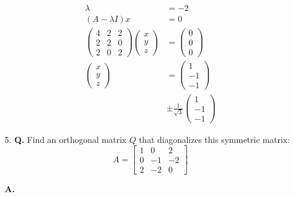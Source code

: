 \documentclass[main.tex]{subfiles}
\begin{document}
\begin{enumerate}
    $$
    \begin{aligned}        
    \lambda &= -2\\
    (A-\lambda I) x &= 0\\
    \left(\begin{array}{lll}
    4 & 2 & 2 \\
    2 & 2 & 0 \\
    2 & 0 & 2
    \end{array}\right)\left(\begin{array}{l}
    x \\
    y \\
    z
    \end{array}\right)&=\left(\begin{array}{l}
    0 \\
    0 \\
    0
    \end{array}\right) \\
    \left(\begin{array}{l}
    x \\
    y \\
    z
    \end{array}\right)&=\left(\begin{array}{l}
    1 \\
    -1 \\
    -1
    \end{array}\right)\\
    & \pm \frac{1}{\sqrt{3}}\left(\begin{array}{l}
    1 \\
    -1 \\
    -1
    \end{array}\right)
    \end{aligned}
    $$
        
    \item [5.] \textbf{Q.} Find an orthogonal matrix $Q$ that diagonalizes this symmetric matrix:
    $$
    A=\left[\begin{array}{rrr}
    1 & 0 & 2 \\
    0 & -1 & -2 \\
    2 & -2 & 0
    \end{array}\right]
    $$
    
    \textbf{A.}
    

\end{enumerate}
\end{document}
